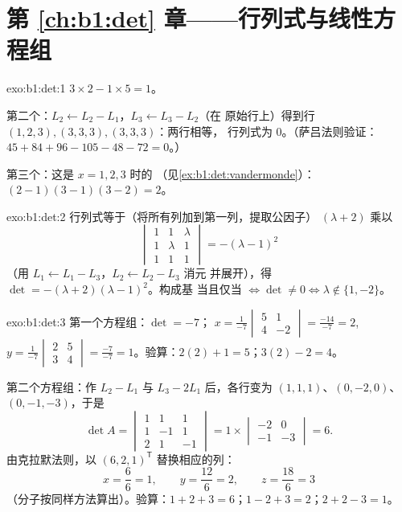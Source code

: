 \section*{第 \ref{ch:b1:det} 章——行列式与线性方程组}

\begin{solution}{exo:b1:det:1}
$3 \times 2 - 1 \times 5 = 1$。

第二个：$L_2 \leftarrow L_2 - L_1$，$L_3 \leftarrow L_3 - L_2$（在
原始行上）得到行 $(1,2,3), (3,3,3), (3,3,3)$：两行相等，
行列式为 $0$。（萨吕法则验证：$45 + 84 + 96 - 105 - 48 -
72 = 0$。）

第三个：这是 $x = 1, 2, 3$ 时的
（见\cref{ex:b1:det:vandermonde}）：$(2-1)(3-1)(3-2) = 2$。
\end{solution}

\begin{solution}{exo:b1:det:2}
行列式等于（将所有列加到第一列，提取公因子）
$(\lambda + 2)$ 乘以
\[
\begin{vmatrix}
1 & 1 & \lambda\\ 1 & \lambda & 1\\ 1 & 1 & 1
\end{vmatrix}
= -(\lambda - 1)^2
\]
（用 $L_1 \leftarrow L_1 - L_3$，$L_2 \leftarrow L_2 - L_3$ 消元
并展开），得 $\det = -(\lambda+2)(\lambda-1)^2$。构成基
当且仅当 $\iff \det \neq 0 \iff \lambda \notin \{1, -2\}$。
\end{solution}

\begin{solution}{exo:b1:det:3}
第一个方程组：$\det = -7$；
$x = \frac{1}{-7}\begin{vmatrix} 5 & 1\\ 4 & -2\end{vmatrix}
= \frac{-14}{-7} = 2$,
$y = \frac{1}{-7}\begin{vmatrix} 2 & 5\\ 3 & 4\end{vmatrix}
= \frac{-7}{-7} = 1$。验算：$2(2) + 1 = 5$；$3(2) - 2 = 4$。

第二个方程组：作 $L_2 - L_1$ 与 $L_3 - 2L_1$ 后，各行变为
$(1,1,1)$、$(0,-2,0)$、$(0,-1,-3)$，于是
\[
\det A = \begin{vmatrix} 1&1&1\\ 1&-1&1\\ 2&1&-1\end{vmatrix}
= 1 \times \begin{vmatrix} -2 & 0\\ -1 & -3\end{vmatrix} = 6 .
\]
由克拉默法则，以 $(6,2,1)^{\mathsf T}$ 替换相应的列：
\[
x = \frac{6}{6} = 1, \qquad
y = \frac{12}{6} = 2, \qquad
z = \frac{18}{6} = 3
\]
（分子按同样方法算出）。验算：$1 + 2 + 3 = 6$；$1 -
2 + 3 = 2$；$2 + 2 - 3 = 1$。
\end{solution}

